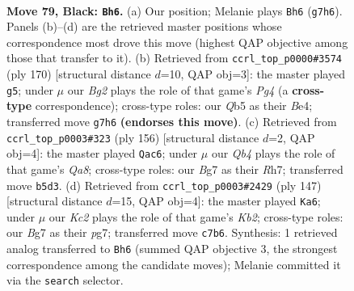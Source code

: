 \documentclass[11pt]{article}
\begin{document}
\clearpage

\begin{figure}[p]\centering
\begin{subfigure}{0.46\textwidth}\centering
\resizebox{\linewidth}{!}{%
\newchessgame
\chessboard[
  setfen={8/2k3b1/8/1q6/8/6K1/8/5q2 b - - 1 79},
  showmover=false,
  pgfstyle=straightmove, color=movearrow, markmove={g7-h6}
]}
\caption{}
\end{subfigure}\hfill
\begin{subfigure}{0.46\textwidth}\centering
\resizebox{\linewidth}{!}{%
\newchessgame
\chessboard[
  setfen={Q7/4k3/7K/8/4B1P1/8/8/8 w - - 2 86},
  showmover=false,
  pgfstyle=straightmove, color=movearrow, markmove={g4-g5}
]}
\caption{}
\end{subfigure}
\\[4pt]
\begin{subfigure}{0.46\textwidth}\centering
\resizebox{\linewidth}{!}{%
\newchessgame
\chessboard[
  setfen={Q3Q3/7R/8/5K2/3k4/8/8/8 w - - 1 79},
  showmover=false,
  pgfstyle=straightmove, color=movearrow, markmove={a8-c6}
]}
\caption{}
\end{subfigure}\hfill
\begin{subfigure}{0.46\textwidth}\centering
\resizebox{\linewidth}{!}{%
\newchessgame
\chessboard[
  setfen={8/1k4P1/7K/q7/8/5Q2/8/q7 b - - 9 74},
  showmover=false,
  pgfstyle=straightmove, color=movearrow, markmove={b7-a6}
]}
\caption{}
\end{subfigure}
\caption{\textbf{Move 79, Black: \texttt{Bh6}.} (a) Our position; Melanie plays \texttt{Bh6} (\texttt{g7h6}). Panels (b)--(d) are the retrieved master positions whose correspondence most drove this move (highest QAP objective among those that transfer to it). (b) Retrieved from \texttt{ccrl\_top\_p0000\#3574} (ply 170) [structural distance $d$=10, QAP obj=3]: the master played \texttt{g5}; under $\mu$ our \emph{Bg2} plays the role of that game's \emph{Pg4} (a \textbf{cross-type} correspondence); cross-type roles: our \emph{Q}b5 as their \emph{B}e4; transferred move \texttt{g7h6} \textbf{(endorses this move)}. (c) Retrieved from \texttt{ccrl\_top\_p0003\#323} (ply 156) [structural distance $d$=2, QAP obj=4]: the master played \texttt{Qac6}; under $\mu$ our \emph{Qb4} plays the role of that game's \emph{Qa8}; cross-type roles: our \emph{B}g7 as their \emph{R}h7; transferred move \texttt{b5d3}. (d) Retrieved from \texttt{ccrl\_top\_p0003\#2429} (ply 147) [structural distance $d$=15, QAP obj=4]: the master played \texttt{Ka6}; under $\mu$ our \emph{Kc2} plays the role of that game's \emph{Kb2}; cross-type roles: our \emph{B}g7 as their \emph{p}g7; transferred move \texttt{c7b6}. Synthesis: 1 retrieved analog transferred to \texttt{Bh6} (summed QAP objective 3, the strongest correspondence among the candidate moves); Melanie committed it via the \texttt{search} selector.}
\label{fig:thought-m157}
\end{figure}
\end{document}
